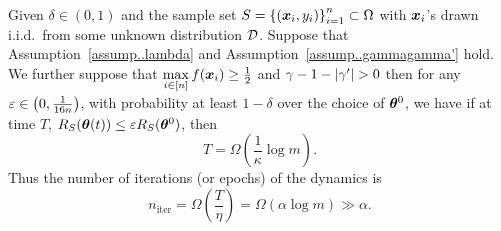 \documentclass{article}
\begin{document}
\begin{thm}\label{thm..NonLazyRegime}
     Given $\delta\in(0,1)$ and the sample set $S = {\{(\bm{x}_i, y_i)\}}_{i=1}^n\subset\Omega$ with $\bm{x}_i$'s drawn i.i.d.\ from some unknown distribution $\mathcal{D}$. Suppose that Assumption~\ref{assump..lambda} and Assumption~\ref{assump..gammagamma'} hold. We further suppose that $\max\limits_{i\in[n]}f(\bm{x}_i)\geq\frac{1}{2}$ and $\gamma-1-\lvert\gamma'\rvert>0$ then for any $\varepsilon\in\left(0,\frac{1}{16n}\right)$, with probability at least $1-\delta$ over the choice of $\bm{\theta}^0$, we have if at time $T$, $R_S(\bm{\theta}(t))\leq\varepsilon R_S(\bm{\theta}^0)$, then
    \begin{equation}
        T=\Omega\left(\frac{1}{\kappa}\log m\right).
    \end{equation}
    Thus the number of iterations (or epochs) of the dynamics is
    \begin{equation}
        n_\mathrm{iter}=\Omega\left(\frac{T}{\eta}\right)=\Omega\left(\alpha\log m\right)\gg \alpha.
    \end{equation}
\end{thm}


\appendix
\end{document}

